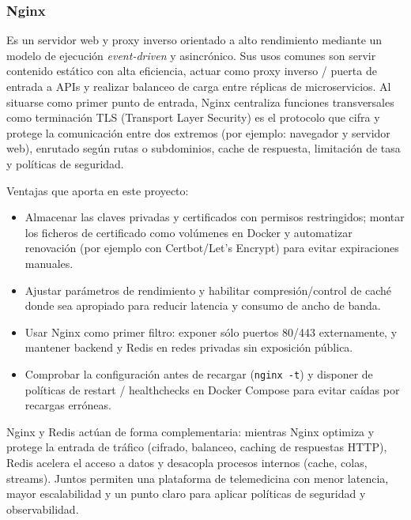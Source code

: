 \documentclass[12pt, a4paper]{article}
\begin{document}
\subsubsection{Nginx}
 Es un servidor web y proxy inverso orientado a alto rendimiento mediante un modelo de ejecución \emph{event-driven} y asincrónico. Sus usos comunes son servir contenido estático con alta eficiencia, actuar como proxy inverso / puerta de entrada a APIs y realizar balanceo de carga entre réplicas de microservicios. Al situarse como primer punto de entrada, Nginx centraliza funciones transversales como terminación TLS (Transport Layer Security) es el protocolo que cifra y protege la comunicación entre dos extremos (por ejemplo: navegador y servidor web), enrutado según rutas o subdominios, cache de respuesta, limitación de tasa y políticas de seguridad.\cite{nginx_reverseproxy,nginx_docs}


Ventajas que aporta en este proyecto:
\begin{itemize}
	\item Almacenar las claves privadas y certificados con permisos restringidos; montar los ficheros de certificado como volúmenes en Docker y automatizar renovación (por ejemplo con Certbot/Let's Encrypt) para evitar expiraciones manuales. \cite{certbot_doc}
	\item Ajustar parámetros de rendimiento y habilitar compresión/control de caché donde sea apropiado para reducir latencia y consumo de ancho de banda.
	\item Usar Nginx como primer filtro: exponer sólo puertos 80/443 externamente, y mantener backend y Redis en redes privadas sin exposición pública.
	\item Comprobar la configuración antes de recargar (\texttt{nginx -t}) y disponer de políticas de restart / healthchecks en Docker Compose para evitar caídas por recargas erróneas.
\end{itemize}

Nginx y Redis actúan de forma complementaria: mientras Nginx optimiza y protege la entrada de tráfico (cifrado, balanceo, caching de respuestas HTTP), Redis acelera el acceso a datos y desacopla procesos internos (cache, colas, streams). Juntos permiten una plataforma de telemedicina con menor latencia, mayor escalabilidad y un punto claro para aplicar políticas de seguridad y observabilidad. \cite{nginx_reverseproxy,nginx_loadbalancer,redis_pubsub}
\end{document}
